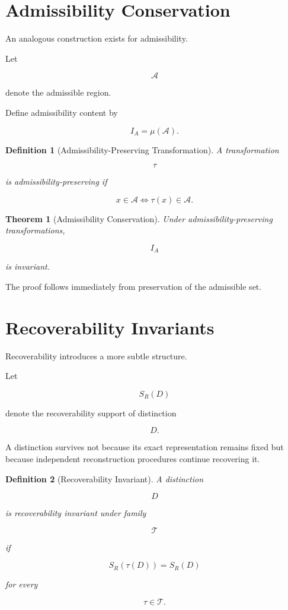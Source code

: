 \documentclass[11pt,oneside,openany]{book}
\newtheorem{definition}{Definition}[chapter] \newtheorem{theorem}{Theorem}[chapter] \newtheorem{proposition}{Proposition}[chapter] \newtheorem{lemma}{Lemma}[chapter] \newtheorem{corollary}{Corollary}[chapter] \newtheorem{remark}{Remark}[chapter]
\begin{document}
\section{Admissibility Conservation}

An analogous construction exists for admissibility.

Let

\[
\mathcal A
\]

denote the admissible region.

Define admissibility content by

\[
I_A
=
\mu(\mathcal A).
\]

\begin{definition}[Admissibility-Preserving Transformation]

A transformation

\[
\tau
\]

is admissibility-preserving if

\[
x\in\mathcal A
\Longleftrightarrow
\tau(x)\in\mathcal A.
\]

\end{definition}

\begin{theorem}[Admissibility Conservation]

Under admissibility-preserving transformations,

\[
I_A
\]

is invariant.

\end{theorem}

The proof follows immediately from preservation of the admissible set.

\section{Recoverability Invariants}

Recoverability introduces a more subtle structure.

Let

\[
S_R(D)
\]

denote the recoverability support of distinction

\[
D.
\]

A distinction survives not because its exact representation remains fixed but because independent reconstruction procedures continue recovering it.

\begin{definition}[Recoverability Invariant]

A distinction

\[
D
\]

is recoverability invariant under family

\[
\mathcal T
\]

if

\[
S_R(\tau(D))
=
S_R(D)
\]

for every

\[
\tau\in\mathcal T.
\]

\end{definition}
\end{document}
